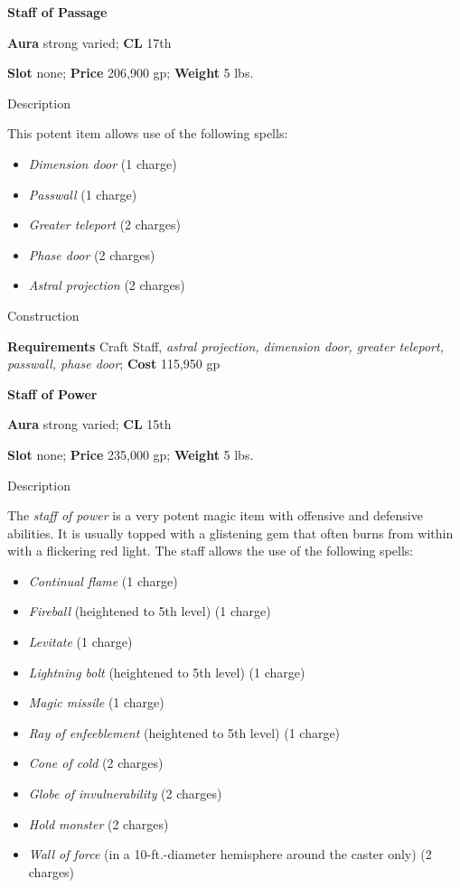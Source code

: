 \textbf{Staff of Passage}
				
\textbf{Aura} strong varied;\textbf{ CL }17th
				
\textbf{Slot} none; \textbf{Price} 206,900 gp; \textbf{Weight} 5 lbs.
				
Description
				
This potent item allows use of the following spells: 
				\begin{itemize}\item  \textit{Dimension door} (1 charge)
				\item  \textit{Passwall} (1 charge)
				\item  \textit{Greater teleport} (2 charges)
				\item  \textit{Phase door} (2 charges)
				\item  \textit{Astral projection} (2 charges) 
\end{itemize}
				
Construction
				
\textbf{Requirements} Craft Staff, \textit{astral projection, dimension door, greater teleport, passwall, phase door}; \textbf{Cost }115,950 gp
				
\textbf{Staff of Power}
				
\textbf{Aura} strong varied; \textbf{CL} 15th
				
\textbf{Slot }none; \textbf{Price} 235,000 gp; \textbf{Weight} 5 lbs.
				
Description
				
The \textit{staff of power }is a very potent magic item with offensive and defensive abilities. It is usually topped with a glistening gem that often burns from within with a flickering red light. The staff allows the use of the following spells:
				\begin{itemize}\item  \textit{Continual flame} (1 charge)
				\item  \textit{Fireball} (heightened to 5th level) (1 charge)
				\item  \textit{Levitate} (1 charge)
				\item  \textit{Lightning bolt} (heightened to 5th level) (1 charge)
				\item  \textit{Magic missile} (1 charge)
				\item  \textit{Ray of enfeeblement} (heightened to 5th level) (1 charge)
				\item  \textit{Cone of cold} (2 charges)
				\item  \textit{Globe of invulnerability} (2 charges)
				\item  \textit{Hold monster} (2 charges)
				\item  \textit{Wall of force} (in a 10-ft.-diameter hemisphere around the caster only) (2 charges)
\end{itemize}
				
